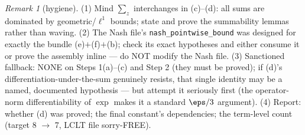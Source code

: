 \documentclass[11pt]{article}
\theoremstyle{plain}
\theoremstyle{remark}
\newtheorem{remark}{Remark}
\begin{document}
\begin{remark}[hygiene]
(1) Mind $\sum_z$ interchanges in (c)--(d): all sums are dominated by
geometric/$\ell^1$ bounds; state and prove the summability lemmas rather than
waving.
(2) The Nash file's \texttt{nash\_pointwise\_bound} was designed for exactly
the bundle (e)$+$(f)$+$(b); check its exact hypotheses and either consume it
or prove the assembly inline --- do NOT modify the Nash file.
(3) Sanctioned fallback: NONE on Steps 1(a)--(c) and Step 2 (they must be
proved); if (d)'s differentiation-under-the-sum genuinely resists, that single
identity may be a named, documented hypothesis --- but attempt it seriously
first (the operator-norm differentiability of $\exp$ makes it a standard
$\eps/3$ argument).
(4) Report: whether (d) was proved; the final constant's dependencies; the
term-level count (target 8 $\to$ 7, LCLT file sorry-FREE).
\end{remark}
\end{document}
